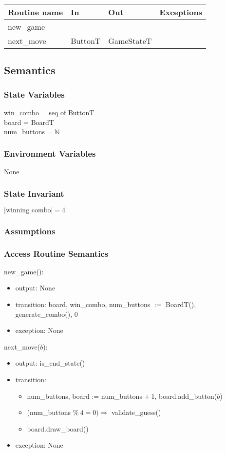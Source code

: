 \documentclass[12pt]{article}
\begin{document}
\begin{tabular}{| l | l | l | l |}
\hline
\textbf{Routine name} & \textbf{In} & \textbf{Out} & \textbf{Exceptions}\\
\hline
new\_game & & &\\
\hline
next\_move & ButtonT & GameStateT & \\
\hline
\end{tabular}

\subsection* {Semantics}

\subsubsection* {State Variables}
win\_combo = seq of ButtonT\\
board = BoardT\\
num\_buttons = $\mathbb{N}$

\subsubsection* {Environment Variables}
None

\subsubsection* {State Invariant}
$|\text{winning\_combo}| = 4$

\subsubsection* {Assumptions}


\subsubsection* {Access Routine Semantics}

\noindent new\_game():
\begin{itemize}
\item output: None
\item transition: board, win\_combo, num\_buttons $:=$ BoardT(), generate\_combo(), 0
\item exception: None
\end{itemize}

\noindent next\_move($b$):
\begin{itemize}
\item output: is\_end\_state()
\item transition:
\begin{itemize}
    \item num\_buttons, board := num\_buttons $+\ 1$, board.add\_button($b$)
    \item (num\_buttons $\% \ 4 = 0) \Rightarrow$ validate\_guess()
    \item board.draw\_board()
\end{itemize}
\item exception: None
\end{itemize}
\end{document}
